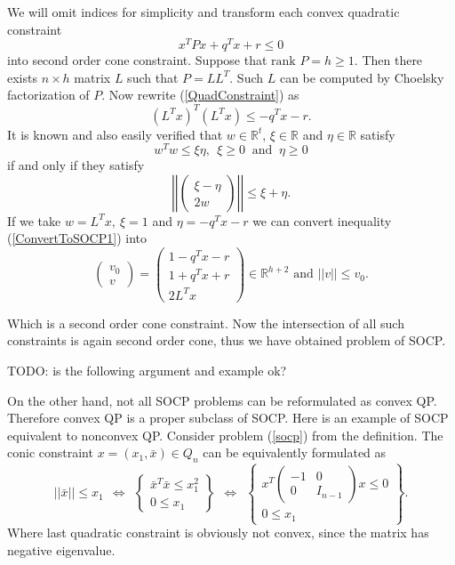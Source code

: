 \documentclass[10pt,oneside]{book}
\theoremstyle{definition}
\begin{document}
We will omit indices for simplicity and transform each convex quadratic constraint 
\begin{equation}
\label{QuadConstraint}
x^TPx + q^Tx + r \leq 0
\end{equation} 
into second order cone constraint.  Suppose that $\mbox{rank }P = h\geq 1.$ Then there exists $n\times h$ matrix $L$ such that $P=LL^T$. Such $L$ can be computed by Choelsky factorization of $P$. Now rewrite (\ref{QuadConstraint}) as 
\begin{equation}
\label{ConvertToSOCP1}
(L^Tx)^T(L^Tx)\leq -q^Tx - r.
\end{equation}
It is known and also easily verified that $w\in \mathbb{R}^t$, $\xi \in \mathbb{R}$ and $\eta \in \mathbb{R}$ satisfy
$$w^Tw\leq \xi\eta, \ \ \xi\geq 0\ \mbox{ and } \ \eta\geq 0$$
if and only if they satisfy
$$\left|\left|\left( \begin{array}{c}
\xi-\eta\\
2w
\end{array}\right)\right|\right|
\leq \xi+\eta . $$
If we take $w=L^Tx, \ \xi = 1$ and $\eta = -q^Tx - r$ we can convert inequality (\ref{ConvertToSOCP1}) into
\begin{equation}
\label{ConvertedQCintoSOCC}
\left(\begin{array}{c}
v_0\\
v
\end{array}\right) = 
\left(\begin{array}{c}
1- q^Tx - r\\
1 + q^Tx + r\\
2L^Tx
\end{array}\right)\in \mathbb{R}^{h+2}
\mbox{  and  } ||v||\leq v_0.
\end{equation}

Which is a second order cone constraint. Now the intersection of all such constraints is again second order cone, thus we have obtained problem of SOCP. 


TODO: is the following argument and example ok?

On the other hand, not all SOCP problems can be reformulated as convex QP. Therefore convex QP is a proper subclass of SOCP. 
Here is an example of SOCP equivalent to nonconvex QP.
\ex Consider problem (\ref{socp}) from the definition. The conic constraint $x=(x_1,\bar{x})\in Q_n$ can be equivalently formulated as
\begin{equation}
||\bar{x}||\leq  x_1 \ \ \Leftrightarrow \ \ 
\left\lbrace \begin{array}{r}
\bar{x}^T\bar{x}\leq x_1^2\\
0\leq x_1 
\end{array}\right\rbrace
 \ \ \Leftrightarrow  \ \
 \left\lbrace \begin{array}{l}
 x^T
 \left(\begin{array}{cc}
 -1 & 0 \\
 0 &  I_{n-1}
 \end{array}\right)
 x \leq 0 \\
 0\leq x_1
 \end{array}\right\rbrace .
\end{equation}
Where last quadratic constraint is obviously not convex, since the matrix has negative eigenvalue.
\end{document}
